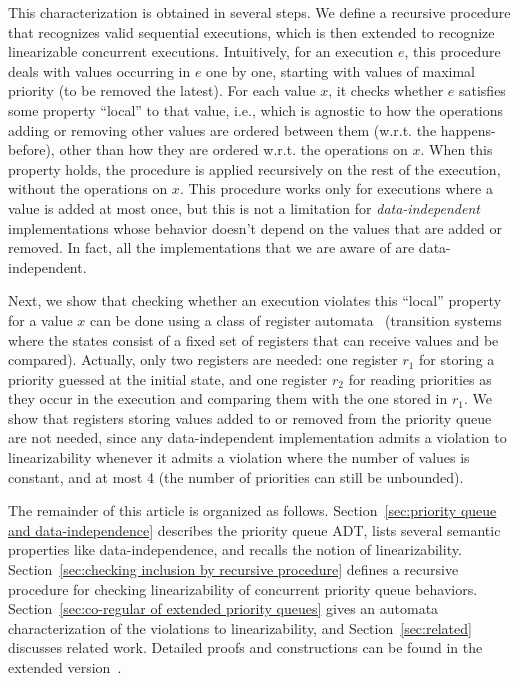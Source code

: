This characterization is obtained in several steps. We define a recursive procedure that recognizes valid sequential executions, which is then extended to recognize linearizable concurrent executions. Intuitively, for an execution $e$, this procedure deals with values occurring in $e$ one by one, starting with values of maximal priority (to be removed the latest). For each value $x$, it checks whether $e$ satisfies some property ``local'' to that value, i.e., which is agnostic to how the operations adding or removing other values are ordered between them (w.r.t. the happens-before), other than how they are ordered w.r.t. the operations on $x$. When this property holds, the procedure is applied recursively on the rest of the execution, without the operations on $x$. This procedure works only for executions where a value is added at most once, but this is not a limitation for \emph{data-independent} implementations whose behavior doesn't depend on the values that are added or removed. In fact, all the implementations that we are aware of are data-independent.

Next, we show that checking whether an execution violates this ``local'' property for a value $x$ can be done using a class of register automata~\cite{DBLP:journals/tcs/KaminskiF94,DBLP:conf/icalp/Cerans94,DBLP:conf/stacs/SegoufinT11} (transition systems where the states consist of a fixed set of registers that can receive values and be compared). Actually, only two registers are needed: one register $r_1$ for storing a priority guessed at the initial state, and one register $r_2$ for reading priorities as they occur in the execution and comparing them with the one stored in $r_1$. We show that registers storing values added to or removed from the priority queue are not needed, since any data-independent implementation admits a violation to linearizability whenever it admits a violation where the number of values is constant, and at most 4 (the number of priorities can still be unbounded).

The remainder of this article is organized as follows.
Section~\ref{sec:priority queue and data-independence} describes the priority queue ADT, lists several semantic properties like data-independence, and recalls the notion of linearizability.
Section~\ref{sec:checking inclusion by recursive procedure} defines a recursive procedure for checking linearizability of concurrent priority queue behaviors.
Section~\ref{sec:co-regular of extended priority queues} gives an automata characterization of the violations to linearizability, and
Section~\ref{sec:related} discusses related work. Detailed proofs and constructions can be found in the extended version~\cite{CONCUR2017Ahmed}.





